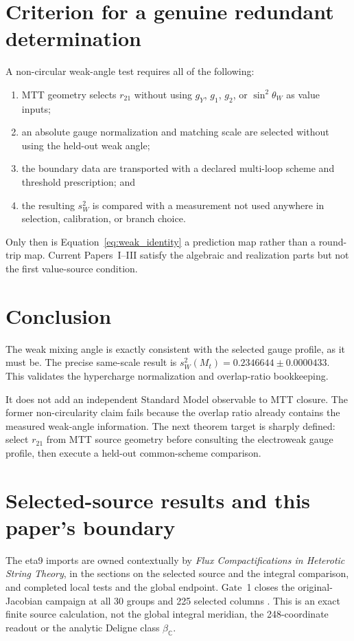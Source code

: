 \documentclass[11pt]{article}
\begin{document}
\section{Criterion for a genuine redundant determination}

A non-circular weak-angle test requires all of the following:
\begin{enumerate}
\item MTT geometry selects $r_{21}$ without using $g_Y$, $g_1$, $g_2$, or
$\sin^2\theta_W$ as value inputs;
\item an absolute gauge normalization and matching scale are selected without
using the held-out weak angle;
\item the boundary data are transported with a declared multi-loop scheme and
threshold prescription; and
\item the resulting $s_W^2$ is compared with a measurement not used anywhere
in selection, calibration, or branch choice.
\end{enumerate}
Only then is Equation~\eqref{eq:weak_identity} a prediction map rather than a
round-trip map. Current Papers~I--III satisfy the algebraic and realization
parts but not the first value-source condition.

\section{Conclusion}

The weak mixing angle is exactly consistent with the selected gauge profile,
as it must be. The precise same-scale result is
$s_W^2(M_t)=0.2346644\pm0.0000433$. This validates the hypercharge
normalization and overlap-ratio bookkeeping.

It does not add an independent Standard Model observable to MTT closure. The
former non-circularity claim fails because the overlap ratio already contains
the measured weak-angle information. The next theorem target is sharply
defined: select $r_{21}$ from MTT source geometry before consulting the
electroweak gauge profile, then execute a held-out common-scheme comparison.

\section{Selected-source results and this paper's boundary}
\label{sec:theta-source-consumers}

The eta9 imports are owned contextually by \emph{Flux Compactifications in
Heterotic String Theory}, in the sections on the selected source and the
integral comparison, and completed local tests and the global endpoint.
Gate~1 closes the original-Jacobian campaign at all 30 groups and 225 selected
columns \cite{ThetaGate1}. This is an exact finite source calculation, not
the global integral meridian, the 248-coordinate readout or the analytic
Deligne class $\beta_{\mathbb C}$.
\end{document}
